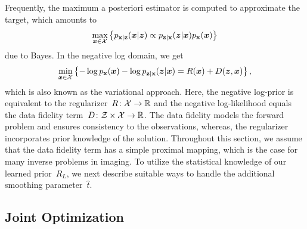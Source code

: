 \documentclass{article}
\newcommand{\X}{\mathcal{X}}
\newcommand{\Z}{\mathcal{Z}}
\def\hatt{{\widehat{t}}}
\newcommand{\pdf}[1]{p_{#1}}
\theoremstyle{plain}
\theoremstyle{definition}
\theoremstyle{remark}
\begin{document}
Frequently, the maximum a posteriori estimator is computed to approximate the target, which amounts to
\[
\max_{\vx\in\X}\left\{\pdf{\rvx\vert\rvz}(\vx\vert\vz)\propto \pdf{\rvz\vert\rvx}(\vz\vert\vx)\pdf{\rvx}(\vx)\right\}
\]
due to Bayes.
In the negative log domain, we get
\[
\min_{\vx\in\X}\left\{ -\log\pdf{\rvx}(\vx) -\log\pdf{\rvz\vert\rvx}(\vz\vert\vx) = R(\vx) + D(\vz,\vx)\right\},
\]
which is also known as the variational approach.
Here, the negative log-prior is equivalent to the regularizer~$R\colon\X\to\R$ and the negative log-likelihood equals the data fidelity term~$D\colon\Z\times\X\to\R$.
The data fidelity models the forward problem and ensures consistency to the observations, whereas, the regularizer incorporates prior knowledge of the solution.
Throughout this section, we assume that the data fidelity term has a simple proximal mapping, which is the case for many inverse problems in imaging.
To utilize the statistical knowledge of our learned prior~$R_L$, we next describe suitable ways to handle the additional smoothing parameter~$\hatt$.

\subsection{Joint Optimization} \label{sec:jointOptimization}
\end{document}
